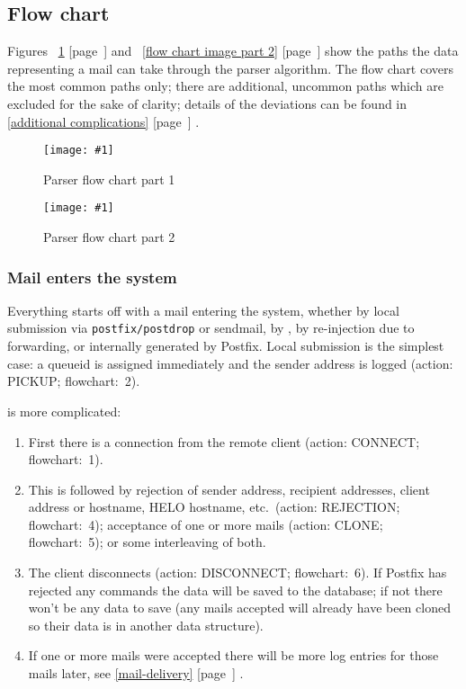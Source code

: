 \documentclass[a4paper,12pt,draft]{article}
\newcommand{\showgraph}[3]{
    \begin{figure}[hbt!]
        \caption{#2}\label{#3}
        \texttt{[image: \#1]}
    \end{figure}
}
\newcommand{\refwithpage}[1]{%
    \empty{}\ref{#1} [page~\pageref{#1}]%
}
\newcommand{\sectionref}[1]{%
    \textsection{}\refwithpage{#1}%
}
\newcommand{\daemon}[1]{%
    \texttt{postfix/#1}%
}
\begin{document}
\subsection{Flow chart}

\label{flow-chart}

Figures~\refwithpage{flow chart image part 1} and~\refwithpage{flow chart
image part 2} show the paths the data representing a mail can take through
the parser algorithm.  The flow chart covers the most common paths only;
there are additional, uncommon paths which are excluded for the sake of
clarity; details of the deviations can be found in \sectionref{additional
complications}.

\showgraph{build/logparser-flow-chart-part-1}{Parser flow chart part
1}{flow chart image part 1}

\showgraph{build/logparser-flow-chart-part-2}{Parser flow chart part
2}{flow chart image part 2}

\clearpage

\subsubsection{Mail enters the system}

\label{mail-enters-the-system}

Everything starts off with a mail entering the system, whether by local
submission via \daemon{postdrop} or sendmail, by \SMTP{}, by re-injection
due to forwarding, or internally generated by Postfix.  Local submission is
the simplest case: a queueid is assigned immediately and the sender address
is logged (action: PICKUP\@; flowchart:~2).

\SMTP{} is more complicated:

\begin{enumerate}

    \item First there is a connection from the remote client (action:
        CONNECT\@; flowchart:~1).

    \item This is followed by rejection of sender address, recipient
        addresses, client \IP{} address or hostname, HELO hostname, etc.\
        (action: REJECTION\@; flowchart:~4); acceptance of one or more
        mails (action: CLONE\@; flowchart:~5); or some interleaving of
        both.

    \item The client disconnects (action: DISCONNECT\@; flowchart:~6).  If
        Postfix has rejected any \SMTP{} commands the data will be saved to
        the database; if not there won't be any data to save (any mails
        accepted will already have been cloned so their data is in another
        data structure).

    \item If one or more mails were accepted there will be more log entries
        for those mails later, see \sectionref{mail-delivery}.

\end{enumerate}
\end{document}
